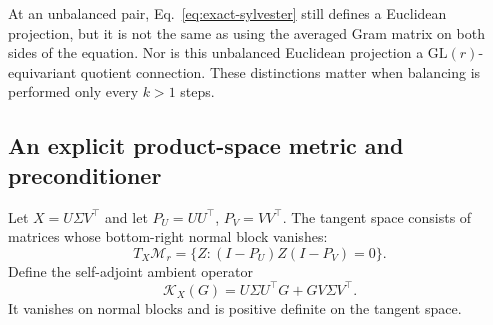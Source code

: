 At an unbalanced pair, Eq.~\eqref{eq:exact-sylvester} still defines a
Euclidean projection, but it is not the same as using the averaged Gram
matrix on both sides of the equation. Nor is this unbalanced Euclidean
projection a $\mathrm{GL}(r)$-equivariant quotient connection. These
distinctions matter when balancing is performed only every $k>1$ steps.

\subsection{An explicit product-space metric and preconditioner}
Let $X=U\Sigma V^\top$ and let $P_U=UU^\top$, $P_V=VV^\top$.
The tangent space consists of matrices whose bottom-right normal block
vanishes:
\begin{equation}
 T_X\mathcal M_r=\{Z:(I-P_U)Z(I-P_V)=0\}.
\end{equation}
Define the self-adjoint ambient operator
\begin{equation}
 \mathcal K_X(G)=U\Sigma U^\top G+GV\Sigma V^\top.
 \label{eq:product-preconditioner}
\end{equation}
It vanishes on normal blocks and is positive definite on the tangent space.

